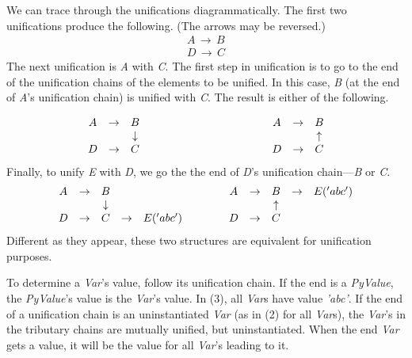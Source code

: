 We can trace through the unifications diagrammatically. The first two unifications produce the following. (The arrows may be reversed.)
\begin{equation}\label{eq:one}
\begin{split}
A \,\to\, B \\
D \,\to\, C 
\end{split}
\end{equation}
The next unification is \textit{A} with \textit{C}. The first step in unification is to go to the end of the unification chains of the elements to be unified. In this case, \textit{B} (at the end of \textit{A}'s unification chain) is unified with \textit{C}. The result is either of the following.

\begin{equation}\label{eq:two}
\begin{array}{c c c c c c c c }
A & \to & B            & \qquad \qquad \qquad \qquad \qquad &   A & \to  & B   \\
  &     & \downarrow   & \qquad \qquad \qquad \qquad \qquad &     &      & \uparrow \\
D & \to & C            & \qquad \qquad \qquad \qquad \qquad &   D & \to  & C
\end{array}
\end{equation}
Finally, to unify \textit{E} with \textit{D}, we go the the end of \textit{D}'s unification chain---\textit{B} or \textit{C}.
\begin{equation}\label{eq:three}
\begin{array}{c c c c c c c c c c c}
A & \to & B            &     &          & \quad \quad  \: &   A & \to  & B & \to & E('abc')   \\
  &     & \downarrow   &     &          & \quad \quad \: &     &      &\uparrow & &  \\
D & \to & C            & \to & E('abc') & \quad \quad \: &   D & \to  & C & & 
\end{array}
\end{equation}
Different as they appear, these two structures are equivalent for unification purposes.

To determine a \textit{Var}'s value, follow its unification chain. If the end is a \textit{PyValue}, the \textit{PyValue}'s value is the \textit{Var}'s value. In (3), all \textit{Var}s have value \textit{'abc'}. If the end of a unification chain is an uninstantiated \textit{Var} (as in (2) for all \textit{Var}s), the \textit{Var}'s in the tributary chains are mutually unified, but uninstantiated. When the end \textit{Var} gets a value, it will be the value for all \textit{Var}'s leading to it.


